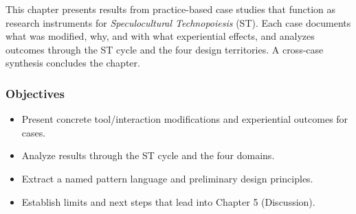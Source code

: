 


This chapter presents results from practice-based case studies that function as research instruments for \textit{Speculocultural Technopoiesis} (ST). Each case documents what was modified, why, and with what experiential effects, and analyzes outcomes through the ST cycle and the four design territories. A cross-case synthesis concludes the chapter.

\subsubsection{Objectives}
\begin{itemize}[nosep]
	\item Present concrete tool/interaction modifications and experiential outcomes for cases.
	\item Analyze results through the ST cycle and the four domains.
	\item Extract a named pattern language and preliminary design principles.
	\item Establish limits and next steps that lead into Chapter 5 (Discussion).
\end{itemize}


